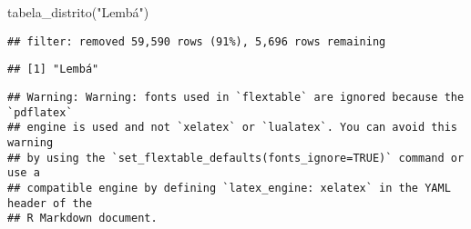 \documentclass[
]{article}
\newenvironment{Shaded}{\begin{snugshade}}{\end{snugshade}}
\newcommand{\FunctionTok}[1]{\textcolor[rgb]{0.00,0.00,0.00}{#1}}
\newcommand{\NormalTok}[1]{#1}
\newcommand{\StringTok}[1]{\textcolor[rgb]{0.31,0.60,0.02}{#1}}
\begin{document}
\begin{Shaded}
\begin{Highlighting}[]
\FunctionTok{tabela\_distrito}\NormalTok{(}\StringTok{"Lembá"}\NormalTok{)}
\end{Highlighting}
\end{Shaded}

\begin{verbatim}
## filter: removed 59,590 rows (91%), 5,696 rows remaining
\end{verbatim}

\begin{verbatim}
## [1] "Lembá"
\end{verbatim}

\begin{verbatim}
## Warning: Warning: fonts used in `flextable` are ignored because the `pdflatex`
## engine is used and not `xelatex` or `lualatex`. You can avoid this warning
## by using the `set_flextable_defaults(fonts_ignore=TRUE)` command or use a
## compatible engine by defining `latex_engine: xelatex` in the YAML header of the
## R Markdown document.
\end{verbatim}

\providecommand{\docline}[3]{\noalign{\global\setlength{\arrayrulewidth}{#1}}\arrayrulecolor[HTML]{#2}\cline{#3}}

\setlength{\tabcolsep}{2pt}

\renewcommand*{\arraystretch}{1.5}
\end{document}

